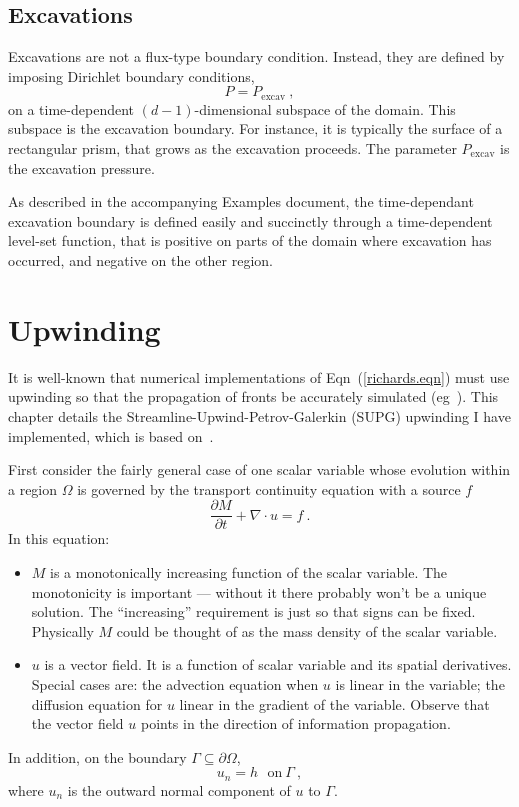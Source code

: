 \documentclass[]{scrreprt}
\begin{document}
\section{Excavations}

Excavations are not a flux-type boundary condition.  Instead, they are
defined by imposing Dirichlet boundary conditions,
\begin{equation}
P = P_{\mathrm{excav}} \ ,
\end{equation}
on a time-dependent $(d-1)$-dimensional subspace of the domain.  This
subspace is the excavation boundary.  For instance, it is typically
the surface of a rectangular prism, that grows as the excavation
proceeds.  The parameter $P_{\mathrm{excav}}$ is the excavation
pressure.

As described in the accompanying Examples document, the time-dependant
excavation boundary is defined easily and succinctly through a time-dependent
level-set function, that is positive on parts of the domain where
excavation has occurred, and negative on the other region.




\chapter{Upwinding}
\label{chap.upwinding}

It is well-known that numerical implementations of
Eqn~(\ref{richards.eqn}) must use upwinding so that the propagation of
fronts be accurately simulated
(eg~\cite{huyakorn1978,dalen1979,helmig1998}).  This chapter details
the Streamline-Upwind-Petrov-Galerkin (SUPG) upwinding I have
implemented, which is based on~\cite{brooks1982, hughes1986}.

First consider the
fairly general case of one scalar variable whose evolution within a
region $\Omega$ is governed
by the transport continuity equation with a source $f$
\begin{equation}
\frac{\partial M}{\partial t} + \nabla\cdot u = f \ .
\label{eqn.continuity}
\end{equation}
In this equation:
\begin{itemize}
\item $M$ is a monotonically increasing function of the scalar variable.  The
  monotonicity is important --- without it there probably won't be a
  unique solution.  The ``increasing'' requirement is just so that
  signs can be fixed.   Physically $M$ could be thought of as the mass
  density of the scalar variable.
\item $u$ is a vector field.  It is a function of scalar variable and its
  spatial derivatives.  Special cases are: the advection equation when
  $u$ is linear in the variable; the diffusion equation for $u$ linear
  in the gradient of the variable.  Observe that the vector field $u$
  points in the direction of information propagation.
\end{itemize}
In addition, on the boundary $\Gamma \subseteq \partial\Omega$,
\begin{equation}
u_{n} = h \ \ \ \mbox{on}\ \Gamma \ ,
\end{equation}
where $u_{n}$ is the outward normal component of $u$ to $\Gamma$.
\end{document}
